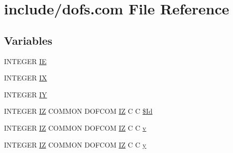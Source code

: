 \hypertarget{dofs_8com}{\section{include/dofs.com File Reference}
\label{dofs_8com}
}
\subsection*{Variables}
\begin{DoxyCompactItemize}
\item 
I\-N\-T\-E\-G\-E\-R \hyperlink{dofs_8com_a83e3373b6b436b5aab6a707f7bd65f5c}{I\-E}
\item 
I\-N\-T\-E\-G\-E\-R \hyperlink{dofs_8com_a07baeb789ede205a8430f46c775fea5b}{I\-X}
\item 
I\-N\-T\-E\-G\-E\-R \hyperlink{dofs_8com_a012fb5e16ba5455759666dfd6bc75de3}{I\-Y}
\item 
I\-N\-T\-E\-G\-E\-R \hyperlink{four_8com_ac8f0d60b0a4b9156d24fd433099b8c49}{I\-Z} C\-O\-M\-M\-O\-N D\-O\-F\-C\-O\-M \hyperlink{four_8com_ac8f0d60b0a4b9156d24fd433099b8c49}{I\-Z} C C \hyperlink{dofs_8com_aa02048c13266f7effa78ea4854f3c21e}{\$\-Id}
\item 
I\-N\-T\-E\-G\-E\-R \hyperlink{four_8com_ac8f0d60b0a4b9156d24fd433099b8c49}{I\-Z} C\-O\-M\-M\-O\-N D\-O\-F\-C\-O\-M \hyperlink{four_8com_ac8f0d60b0a4b9156d24fd433099b8c49}{I\-Z} C C \hyperlink{dofs_8com_ae5a4dac0b159f949f20d92c086d6b337}{v}
\item 
I\-N\-T\-E\-G\-E\-R \hyperlink{four_8com_ac8f0d60b0a4b9156d24fd433099b8c49}{I\-Z} C\-O\-M\-M\-O\-N D\-O\-F\-C\-O\-M \hyperlink{four_8com_ac8f0d60b0a4b9156d24fd433099b8c49}{I\-Z} C C \hyperlink{dofs_8com_a2dae3d2dd6f91457cfd868914f158f8b}{y}
\end{DoxyCompactItemize}


